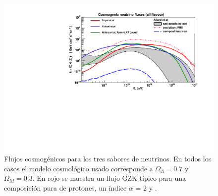 	\begin{figure}[ht]
		\begin{center}
		\includegraphics[width=\textwidth]{fig/introduccion/gzk_fluxes}
		\caption{\label{fig:flujosGZK} Flujos cosmog\'enicos para los tres sabores de neutrinos. En todos los casos el modelo cosmol\'ogico usado corresponde a $\Omega_{\Lambda}=0.7$ y $\Omega_{M}=0.3$. 
		En rojo se muestra un flujo GZK t\'ipico para una composici\'on pura de protones, un \'indice $\alpha$ = 2 y \cite{cite:nuEngel}.
% 		
		}
		\end{center}
	\end{figure}
	
